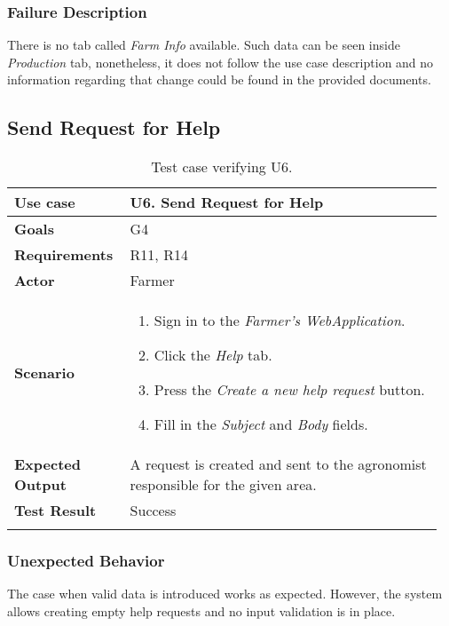 \subsubsection*{Failure Description}

There is no tab called \textit{Farm Info} available. Such data can be seen inside \textit{Production} tab, nonetheless, it does not follow the use case description and no information regarding that change could be found in the provided documents.

\subsection{Send Request for Help}

\begin{longtable}{@{}p{0.25\linewidth}p{0.71\linewidth}@{}}
	\toprule
	\textbf{Use case} & \textbf{U6.} Send Request for Help\\
	\midrule
	\textbf{Goals} & G4\\
	\midrule
	\textbf{Requirements} & R11, R14\\
	\midrule
	\textbf{Actor} & Farmer\\
	\midrule
	\textbf{Scenario} &
	\begin{enumerate}[leftmargin=.4cm,noitemsep,topsep=0pt,before=\vspace{-3mm},after=\vspace{-4mm}]
		\item Sign in to the \textit{Farmer's WebApplication}.
		\item Click the \textit{Help} tab.
		\item Press the \textit{Create a new help request} button.
		\item Fill in the \textit{Subject} and \textit{Body} fields.
	\end{enumerate}\\
	\midrule
	\textbf{Expected Output} & A request is created and sent to the agronomist responsible for the given area.\\
	\midrule
	\textbf{Test Result} & Success\\
	\bottomrule
    \caption{Test case verifying U6.}
\end{longtable}

\subsubsection*{Unexpected Behavior}

The case when valid data is introduced works as expected. However, the system allows creating empty help requests and no input validation is in place.

